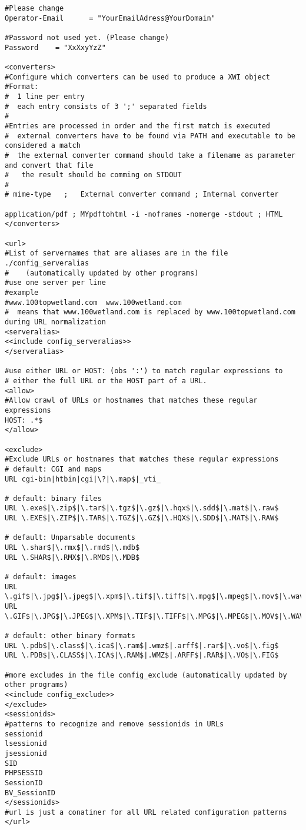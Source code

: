 \begin{verbatim}
#Please change
Operator-Email      = "YourEmailAdress@YourDomain"

#Password not used yet. (Please change)
Password    = "XxXxyYzZ"

<converters>
#Configure which converters can be used to produce a XWI object
#Format:
#  1 line per entry
#  each entry consists of 3 ';' separated fields
#
#Entries are processed in order and the first match is executed
#  external converters have to be found via PATH and executable to be considered a match
#  the external converter command should take a filename as parameter and convert that file
#   the result should be comming on STDOUT
#
# mime-type   ;   External converter command ; Internal converter

application/pdf ; MYpdftohtml -i -noframes -nomerge -stdout ; HTML
</converters>

<url>
#List of servernames that are aliases are in the file ./config_serveralias
#    (automatically updated by other programs)
#use one server per line
#example
#www.100topwetland.com  www.100wetland.com
#  means that www.100wetland.com is replaced by www.100topwetland.com during URL normalization
<serveralias>
<<include config_serveralias>>
</serveralias>

#use either URL or HOST: (obs ':') to match regular expressions to
# either the full URL or the HOST part of a URL.
<allow>
#Allow crawl of URLs or hostnames that matches these regular expressions
HOST: .*$
</allow>

<exclude>
#Exclude URLs or hostnames that matches these regular expressions
# default: CGI and maps
URL cgi-bin|htbin|cgi|\?|\.map$|_vti_

# default: binary files
URL \.exe$|\.zip$|\.tar$|\.tgz$|\.gz$|\.hqx$|\.sdd$|\.mat$|\.raw$
URL \.EXE$|\.ZIP$|\.TAR$|\.TGZ$|\.GZ$|\.HQX$|\.SDD$|\.MAT$|\.RAW$

# default: Unparsable documents
URL \.shar$|\.rmx$|\.rmd$|\.mdb$
URL \.SHAR$|\.RMX$|\.RMD$|\.MDB$

# default: images
URL \.gif$|\.jpg$|\.jpeg$|\.xpm$|\.tif$|\.tiff$|\.mpg$|\.mpeg$|\.mov$|\.wav$|\.au$|\.pcx$|\.xbm$|\.tga$
URL \.GIF$|\.JPG$|\.JPEG$|\.XPM$|\.TIF$|\.TIFF$|\.MPG$|\.MPEG$|\.MOV$|\.WAV$|\.AU$|\.PCX$|\.XBM$|\.TGA$

# default: other binary formats
URL \.pdb$|\.class$|\.ica$|\.ram$|.wmz$|.arff$|.rar$|\.vo$|\.fig$
URL \.PDB$|\.CLASS$|\.ICA$|\.RAM$|.WMZ$|.ARFF$|.RAR$|\.VO$|\.FIG$

#more excludes in the file config_exclude (automatically updated by other programs)
<<include config_exclude>>
</exclude>
<sessionids>
#patterns to recognize and remove sessionids in URLs
sessionid
lsessionid
jsessionid
SID
PHPSESSID
SessionID
BV_SessionID
</sessionids>
#url is just a conatiner for all URL related configuration patterns
</url>
\end{verbatim}
